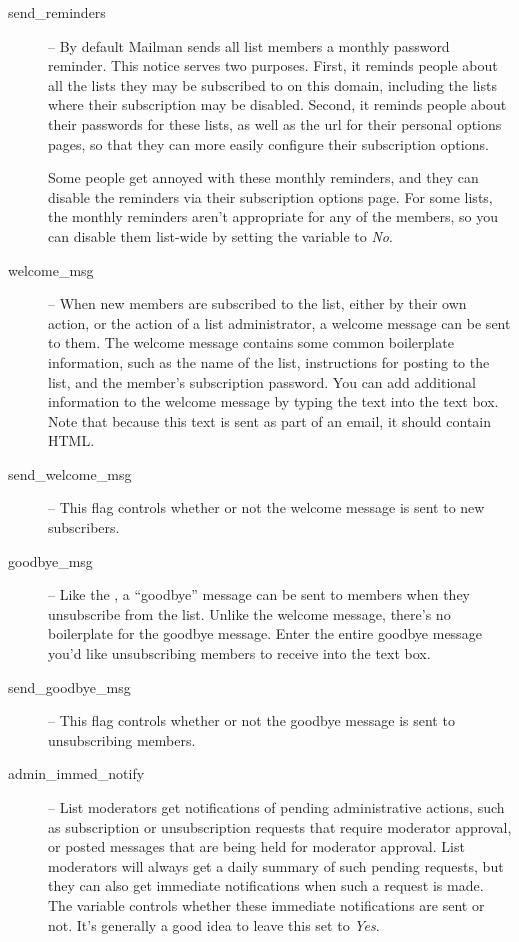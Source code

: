 \documentclass{howto}
\begin{document}
\begin{description}
\item[send_reminders] --
    By default Mailman sends all list members a monthly password
    reminder.  This notice serves two purposes.  First, it reminds
    people about all the lists they may be subscribed to on this
    domain, including the lists where their subscription may be
    disabled.  Second, it reminds people about their passwords for
    these lists, as well as the url for their personal options pages,
    so that they can more easily configure their subscription options.

    Some people get annoyed with these monthly reminders, and they can
    disable the reminders via their subscription options page.  For
    some lists, the monthly reminders aren't appropriate for any of
    the members, so you can disable them list-wide by setting the
     variable to \emph{No}.

\item[welcome_msg] --
    When new members are subscribed to the list, either by their own
    action, or the action of a list administrator, a welcome message
    can be sent to them.  The welcome message contains some common
    boilerplate information, such as the name of the list,
    instructions for posting to the list, and the member's
    subscription password.  You can add additional information to the
    welcome message by typing the text into the 
    text box.  Note that because this text is sent as part of an
    email, it should  contain HTML.

\item[send_welcome_msg] --
    This flag controls whether or not the welcome message is sent to
    new subscribers.

\item[goodbye_msg] --
    Like the , a ``goodbye'' message can be sent to
    members when they unsubscribe from the list.  Unlike the welcome
    message, there's no boilerplate for the goodbye message.  Enter
    the entire goodbye message you'd like unsubscribing members to
    receive into the  text box.

\item[send_goodbye_msg] --
    This flag controls whether or not the goodbye message is sent to
    unsubscribing members.

\item[admin_immed_notify] --
    List moderators get notifications of pending administrative
    actions, such as subscription or unsubscription requests that
    require moderator approval, or posted messages that are being held
    for moderator approval.  List moderators will always get a daily
    summary of such pending requests, but they can also get immediate
    notifications when such a request is made.  The
     variable controls whether these
    immediate notifications are sent or not.  It's generally a good
    idea to leave this set to \emph{Yes}.


\end{description}
\end{document}
